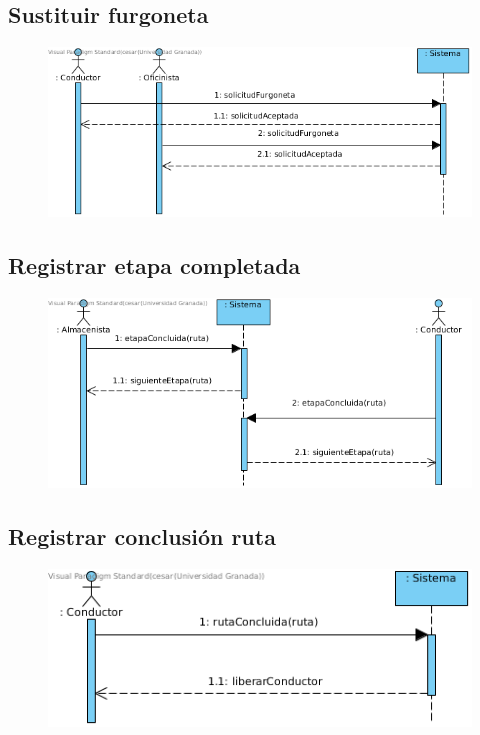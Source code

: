 \subsection{Sustituir furgoneta}
\begin{figure}[H]
	\centering
	\includegraphics[width=16cm]{36}
\end{figure}
\subsection{Registrar etapa completada}
\begin{figure}[H]
	\centering
	\includegraphics[width=16cm]{37}
\end{figure}
\subsection{Registrar conclusión ruta}
\begin{figure}[H]
	\centering
	\includegraphics[width=16cm]{38}
\end{figure}
